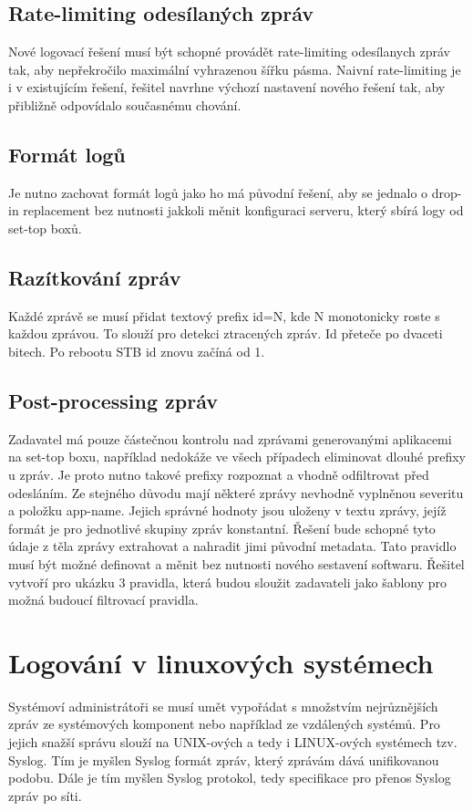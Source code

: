 \documentclass[thesis=B,czech]{FITthesis}[2012/06/26]
\begin{document}
\section*{Rate-limiting odesílaných zpráv}
Nové logovací řešení musí být schopné provádět rate-limiting odesílanych zpráv tak, aby nepřekročilo maximální vyhrazenou šířku pásma. Naivní rate-limiting je i v existujícím řešení, řešitel navrhne výchozí nastavení nového řešení tak, aby přibližně odpovídalo současnému chování. 

\section*{Formát logů}
Je nutno zachovat formát logů jako ho má původní řešení, aby se jednalo o drop-in replacement bez nutnosti jakkoli měnit konfiguraci serveru, který sbírá logy od set-top boxů.

\section*{Razítkování zpráv}
Každé zprávě se musí přidat textový prefix id=N, kde N monotonicky roste s každou zprávou.  To slouží pro detekci ztracených zpráv. Id přeteče po dvaceti bitech. Po rebootu STB id znovu začíná od 1.

\section*{Post-processing zpráv}
Zadavatel má pouze částečnou kontrolu nad zprávami generovanými aplikacemi na set-top boxu, například nedokáže ve všech případech eliminovat dlouhé prefixy u zpráv. Je proto nutno takové prefixy rozpoznat a vhodně odfiltrovat před odesláním. Ze stejného důvodu mají některé zprávy nevhodně vyplněnou severitu a položku app-name. Jejich správné hodnoty jsou uloženy v textu zprávy, jejíž formát je pro jednotlivé skupiny zpráv konstantní. Řešení bude schopné tyto údaje z těla zprávy extrahovat a nahradit jimi původní metadata. Tato pravidlo musí být možné definovat a měnit bez nutnosti nového sestavení softwaru. 
Řešitel vytvoří pro ukázku 3 pravidla, která budou sloužit zadavateli jako šablony pro možná budoucí filtrovací pravidla.

\chapter{Logování v linuxových systémech}
Systémoví administrátoři se musí umět vypořádat s množstvím nejrůznějších zpráv ze systémových komponent nebo například ze vzdálených systémů.
Pro jejich snažší správu slouží na UNIX-ových a tedy i LINUX-ových systémech tzv. Syslog.
Tím je myšlen Syslog formát zpráv, který zprávám dává unifikovanou podobu.
Dále je tím myšlen Syslog protokol, tedy specifikace pro přenos Syslog zpráv po síti.
\end{document}
